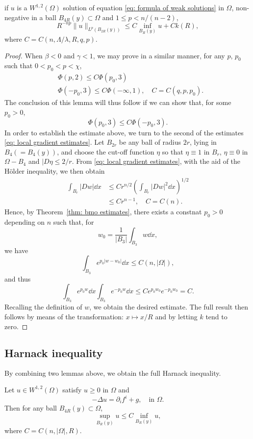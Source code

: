 \begin{lemma}
	if $u$ is a $W^{1,2}(\Omega)$ solution of equation \eqref{eq: formula of weak solutions} in $\Omega$,
	non-negative in a ball $B_{4R}(y)\subset\Omega$ and $1\leq p<n/(n-2)$, 
	\[
		R^{-np}\|u\|_{L^p(B_{2R}(y))} \leq C\inf_{B_R(y)}u + Ck(R),
	\]
	where $C=C(n, \Lambda/\lambda, R, q, p)$.
\end{lemma}
\begin{proof}
	When $\beta<0$ and $\gamma<1$, we may prove in a similar manner, for any $p$, $p_0$ such that 
	$0<p_0 < p < \chi$,
	\begin{align*}
		&\Phi(p,2)\leq C\Phi(p_0,3)\\
		&\Phi(-p_0, 3) \leq C\Phi(-\infty, 1),\quad C = C(q,p,p_0).
	\end{align*}
	The conclusion of this lemma will thus follow if we can show that, for some $p_0 > 0$,
	\[
		\Phi(p_0, 3) \leq C\Phi(-p_0, 3).
	\]
	In order to establish the estimate above, we turn to the second of the estimates \eqref{eq: local gradient estimates}.
	Let $B_{2r}$ be any ball of radius $2r$, lying in $B_4(=B_4(y))$, and choose the cut-off function $\eta$
	so that $\eta\equiv1$ in $B_r$, $\eta\equiv0$ in $\Omega-B_4$ and $|D\eta\leq2/r$.
	From \eqref{eq: local gradient estimates}, with the aid of the H\"older inequality, we then obtain
	\begin{align*}
		\int_{B_r}|Dw|\dd x &\leq Cr^{n/2}\left(\int_{B_r}|Dw|^2\dd x\right)^{1/2}\\
			&\leq Cr^{n-1},\quad C=C(n).
	\end{align*}
	Hence, by Theorem~\ref{thm: bmo estimates}, there exists a constnat $p_0>0$ depending on $n$ such that,
	for 
	\[
		w_0 = \frac{1}{|B_3|}\int_{B_3}w\dd x,
	\]
	we have 
	\[
		\int_{B_3}e^{p_0|w-w_0|}\dd x \leq C(n, |\Omega|),
	\]
	and thus
	\[
		\int_{B_3}e^{p_0w}\dd x \int_{B_3}e^{-p_0w}\dd x 
			\leq C e^{p_0w_0}e^{-p_0w_0} = C.
	\]
	Recalling the definition of $w$, we obtain the desired estimate. 
	The full result then follows by means of the transformation: $x\mapsto x/R$ and by letting $k$ tend to zero.
\end{proof}

\subsection{Harnack inequality}

By combining two lemmas above, we obtain the full Harnack inequality.

\begin{theorem}
	Let $u\in W^{1,2}(\Omega)$ satisfy $u\geq0$ in $\Omega$ and 
	\[
		-\Delta u = \partial_if^i + g,\quad \text{in }\Omega.
	\]
	Then for any ball $B_{4R}(y)\subset\Omega$, 
	\[
		\sup_{B_R(y)}u \leq C\inf_{B_R(y)}u,
	\]
	where $C=C(n,|\Omega|,R)$.
\end{theorem}

